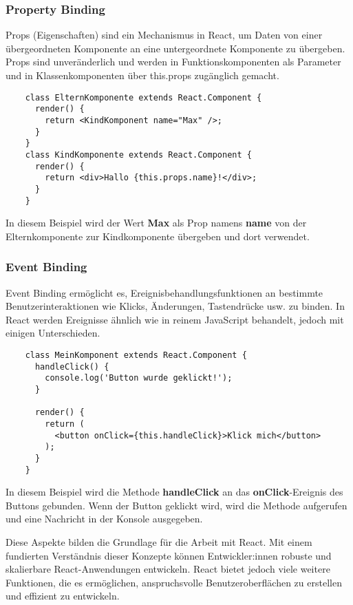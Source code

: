 \cite{frontend_web_react_components}

\subsubsection{Property Binding}
Props (Eigenschaften) sind ein Mechanismus in React, um Daten von einer übergeordneten Komponente an eine untergeordnete Komponente zu übergeben. Props sind unveränderlich und werden in Funktionskomponenten als Parameter und in Klassenkomponenten über this.props zugänglich gemacht.

\begin{lstlisting}
    class ElternKomponente extends React.Component {
      render() {
        return <KindKomponent name="Max" />;
      }
    }
    class KindKomponente extends React.Component {
      render() {
        return <div>Hallo {this.props.name}!</div>;
      }
    }
\end{lstlisting}

In diesem Beispiel wird der Wert \textbf{Max} als Prop namens \textbf{name} von der Elternkomponente zur Kindkomponente übergeben und dort verwendet.

\cite{frontend_web_react_components}

\subsubsection{Event Binding}
Event Binding ermöglicht es, Ereignisbehandlungsfunktionen an bestimmte Benutzerinteraktionen wie Klicks, Änderungen, Tastendrücke usw. zu binden. In React werden Ereignisse ähnlich wie in reinem JavaScript behandelt, jedoch mit einigen Unterschieden.

\begin{lstlisting}
    class MeinKomponent extends React.Component {
      handleClick() {
        console.log('Button wurde geklickt!');
      }
    
      render() {
        return (
          <button onClick={this.handleClick}>Klick mich</button>
        );
      }
    }
\end{lstlisting}

In diesem Beispiel wird die Methode \textbf{handleClick} an das \textbf{onClick}-Ereignis des Buttons gebunden. Wenn der Button geklickt wird, wird die Methode aufgerufen und eine Nachricht in der Konsole ausgegeben.

Diese Aspekte bilden die Grundlage für die Arbeit mit React. Mit einem fundierten Verständnis dieser Konzepte können Entwickler:innen robuste und skalierbare React-Anwendungen entwickeln. React bietet jedoch viele weitere Funktionen, die es ermöglichen, anspruchsvolle Benutzeroberflächen zu erstellen und effizient zu entwickeln.


\cite{frontend_web_react_events}
